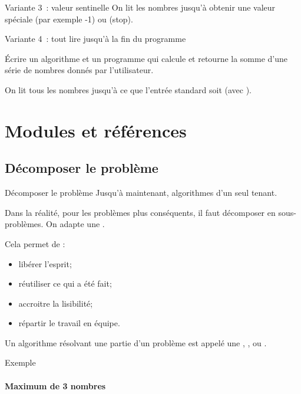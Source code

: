 \begin{hideedit}
\begin{frame}{Variante 3~: valeur sentinelle}
  On lit les nombres jusqu'à obtenir une valeur spéciale (par exemple -1)
  \pause ou (stop).

\end{frame}

\begin{frame}{Variante 4~: tout lire jusqu'à la fin du programme}
  \begin{block}{}
    Écrire un algorithme et un programme qui calcule et retourne
    la somme d’une série de nombres donnés par l’utilisateur.
  \end{block}

  On lit tous les nombres jusqu'à ce que l'entrée standard soit
   (avec ).
\end{frame}


\section{Modules et références}
\frame{\sectionpage}

\subsection{Décomposer le problème}
\begin{frame}{Décomposer le problème}
  Jusqu'à maintenant, algorithmes d'un seul tenant.

  Dans la réalité, pour les problèmes plus conséquents, il faut décomposer
  en sous-problèmes. On adapte une .

  \pause
  Cela permet de :
  \begin{itemize}
    \item libérer l'esprit;
    \item réutiliser ce qui a été fait;
    \item accroitre la lisibilité;
    \item répartir le travail en équipe.
  \end{itemize}

  \pause
  Un algorithme résolvant une partie d'un problème est appelé une
  , ,  ou
  .
\end{frame}

\begin{frame}[fragile]{Exemple}
\framesubtitle{Maximum de 3 nombres}
  \begin{center}
  \end{center}


\end{frame}
\end{hideedit}
